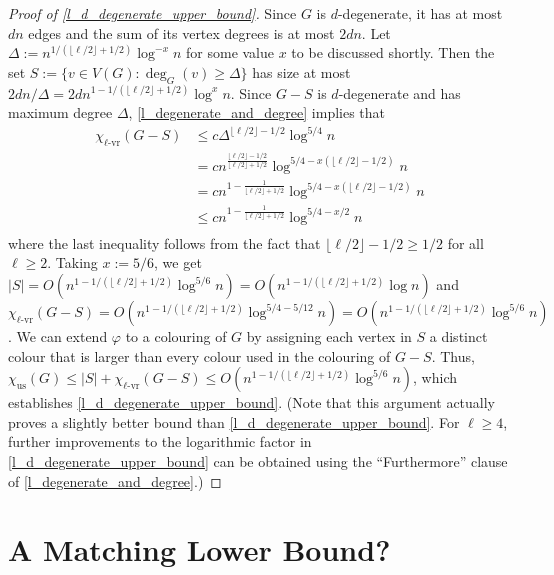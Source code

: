 \documentclass{patmorin}
\newcommand{\rn}[1]{\chi_{\operatorname{#1-vr}}}
\newcommand{\trn}{\chi_{\mathrm{us}}}
\newcommand{\lrn}{\rn{\ell}}
\newcommand{\texp}{1-1/(\lfloor\ell/2\rfloor+1/2)}
\newcommand{\dexp}{1-\frac{1}{\lfloor\ell/2\rfloor+1/2}}
\begin{document}
\begin{proof}[Proof of \cref{l_d_degenerate_upper_bound}]
  Since $G$ is $d$-degenerate, it has at most $dn$ edges and the sum of its vertex degrees is at most $2dn$.  Let $\Delta:=n^{1/(\lfloor\ell/2\rfloor+1/2)}\log^{-x} n$ for some value $x$ to be discussed shortly.  Then the set $S:=\{v\in V(G):\deg_G(v)\ge \Delta\}$ has size at most $2dn/\Delta=2dn^{\texp}\log^x n$.  Since $G-S$ is $d$-degenerate and has maximum degree $\Delta$, \cref{l_degenerate_and_degree} implies that
  \begin{align*}
    \lrn(G-S) &
    \le c\Delta^{\lfloor\ell/2\rfloor-1/2}\log^{5/4} n \\
    & = cn^{\frac{\lfloor\ell/2\rfloor-1/2}{\lfloor\ell/2\rfloor+1/2}}\log^{5/4-x(\lfloor\ell/2\rfloor-1/2)} n \\
    & = cn^{\dexp}\log^{5/4-x(\lfloor\ell/2\rfloor-1/2)} n \\
    & \le cn^{\dexp}\log^{5/4-x/2} n \\
  \end{align*}
  where the last inequality follows from the fact that $\lfloor\ell/2\rfloor-1/2\ge 1/2$ for all $\ell\ge 2$.  Taking $x:=5/6$, we get $|S|=O(n^{\texp}\log^{5/6} n)=O(n^{\texp}\log n)$ and  $\lrn(G-S)= O(n^{\texp}\log^{5/4-5/12} n)=O(n^{\texp}\log^{5/6} n)$.  We can extend $\varphi$ to a colouring of $G$ by assigning each vertex in $S$ a distinct colour that is larger than every colour used in the colouring of $G-S$.  Thus, $\trn(G)\le |S|+\lrn(G-S) \le O(n^{\texp}\log^{5/6} n)$, which establishes \cref{l_d_degenerate_upper_bound}.  (Note that this argument actually proves a slightly better bound than \cref{l_d_degenerate_upper_bound}.  For $\ell\ge 4$, further improvements to the logarithmic factor in \cref{l_d_degenerate_upper_bound} can be obtained using the ``Furthermore'' clause of \cref{l_degenerate_and_degree}.)
\end{proof}

%



\section{A Matching Lower Bound?}
\end{document}
